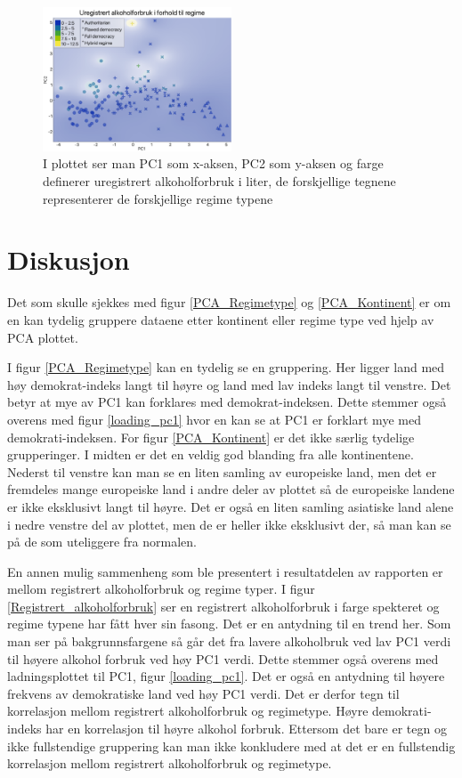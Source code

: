 \documentclass[twocolumn, 11pt]{article} %
\begin{document}
\begin{figure}[H]
\includegraphics[width=0.5\textwidth]{images/Uregistrert_alkoholforbruk.png}
\caption{I plottet ser man PC1 som x-aksen, PC2 som y-aksen og farge definerer uregistrert alkoholforbruk i liter, de forskjellige tegnene representerer de forskjellige regime typene}
\label{Uregistrert_alkoholforbruk}
\end{figure}

\section{Diskusjon}

Det som skulle sjekkes med figur \ref{PCA_Regimetype} og \ref{PCA_Kontinent} er om en kan tydelig gruppere dataene etter kontinent eller regime type ved hjelp av PCA plottet. 

I figur \ref{PCA_Regimetype} kan en tydelig se en gruppering. Her ligger land med høy demokrat-indeks langt til høyre og land med lav indeks langt til venstre. Det betyr at mye av PC1 kan forklares med demokrat-indeksen. Dette stemmer også overens med figur \ref{loading_pc1} hvor en kan se at PC1 er forklart mye med demokrati-indeksen.
For figur \ref{PCA_Kontinent} er det ikke særlig tydelige grupperinger. I midten er det en veldig god blanding fra alle kontinentene. Nederst til venstre kan man se en liten samling av europeiske land, men det er fremdeles mange europeiske land i andre deler av plottet så de europeiske landene er ikke eksklusivt langt til høyre. Det er også en liten samling asiatiske land alene i nedre venstre del av plottet, men de er heller ikke eksklusivt der, så man kan se på de som uteliggere fra normalen. 

En annen mulig sammenheng som ble presentert i resultatdelen av rapporten er mellom registrert alkoholforbruk og regime typer. I figur \ref{Registrert_alkoholforbruk} ser en registrert alkoholforbruk i farge spekteret og regime typene har fått hver sin fasong. Det er en antydning til en trend her. Som man ser på bakgrunnsfargene så går det fra lavere alkoholbruk ved lav PC1 verdi til høyere alkohol forbruk ved høy PC1 verdi. Dette stemmer også overens med ladningsplottet til PC1, figur \ref{loading_pc1}. Det er også en antydning til høyere frekvens av demokratiske land ved høy PC1 verdi. Det er derfor tegn til korrelasjon mellom registrert alkoholforbruk og regimetype. Høyre demokrati-indeks har en korrelasjon til høyre alkohol forbruk. Ettersom det bare er tegn og ikke fullstendige gruppering kan man ikke konkludere med at det er en fullstendig korrelasjon mellom registrert alkoholforbruk og regimetype.
\end{document}
